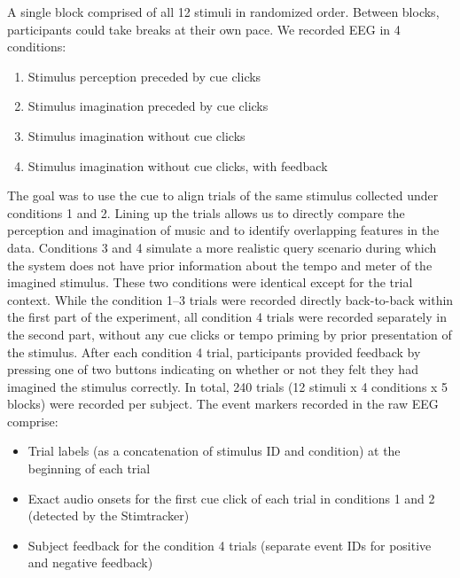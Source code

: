 A single block comprised of all 12 stimuli in randomized order.
Between blocks, participants could take breaks at their own pace.
We recorded EEG in 4 conditions:
\begin{enumerate}
\item
Stimulus perception preceded by cue clicks
\item
Stimulus imagination preceded by cue clicks
\item
Stimulus imagination without cue clicks
\item
Stimulus imagination without cue clicks, with feedback
\end{enumerate}
The goal was to use the cue to align trials of the same stimulus collected under conditions 1 and 2. Lining up the trials allows us to directly compare the perception and imagination of music and to identify overlapping features in the data. 
Conditions 3 and 4 simulate a more realistic query scenario during which the system does not have prior information about the tempo and meter of the imagined stimulus.
These two conditions were identical except for the trial context.
While the condition 1--3 trials were recorded directly back-to-back within the first part of the experiment, 
all condition 4 trials were recorded separately in the second part, without any cue clicks or tempo priming by prior presentation of the stimulus.
After each condition 4 trial, participants provided feedback by pressing one of two buttons indicating on whether or not they felt they had imagined the stimulus correctly.
In total, 240 trials (12 stimuli x 4 conditions x 5 blocks) were recorded per subject.
%
The event markers recorded in the raw EEG comprise:
\begin{itemize}
\item
	Trial labels (as a concatenation of stimulus ID and condition) at the beginning of each trial
\item
	Exact audio onsets for the first cue click of each trial in conditions 1 and 2 (detected by the Stimtracker)
\item
	Subject feedback for the condition 4 trials (separate event IDs for positive and negative feedback)
\end{itemize}	



